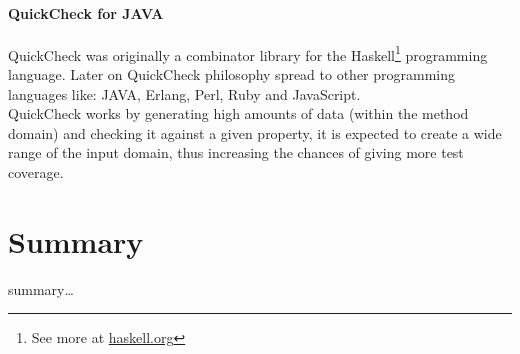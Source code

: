 \paragraph{QuickCheck for JAVA}
QuickCheck was originally a combinator library for the Haskell\footnote{See more at \url{haskell.org}} programming language\cite{Claessen:2000:QLT:357766.351266}.
Later on QuickCheck philosophy spread to other programming languages like: JAVA, Erlang, Perl, Ruby and JavaScript.\\
QuickCheck works by generating high amounts of data (within the method domain) and checking it against a given property,
it is expected to create a wide range of the input domain, thus increasing the chances of giving more test coverage.

\section{Summary}
summary\ldots
\secendnote
